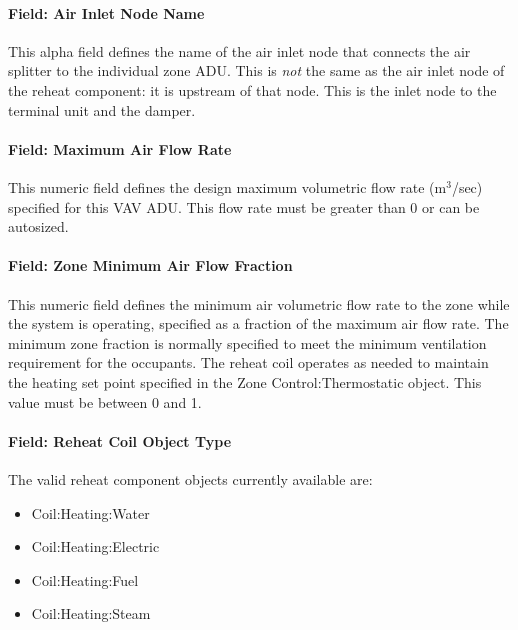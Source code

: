 \paragraph{Field: Air Inlet Node Name}\label{field-air-inlet-node-name-3}

This alpha field defines the name of the air inlet node that connects the air splitter to the individual zone ADU. This is \emph{not} the same as the air inlet node of the reheat component: it is upstream of that node. This is the inlet node to the terminal unit and the damper.

\paragraph{Field: Maximum Air Flow Rate}\label{field-maximum-air-flow-rate-3}

This numeric field defines the design maximum volumetric flow rate (m\(^{3}\)/sec) specified for this VAV ADU. This flow rate must be greater than 0 or can be autosized.

\paragraph{Field: Zone Minimum Air Flow Fraction}\label{field-zone-minimum-air-flow-fraction-1}

This numeric field defines the minimum air volumetric flow rate to the zone while the system is operating, specified as a fraction of the maximum air flow rate. The minimum zone fraction is normally specified to meet the minimum ventilation requirement for the occupants. The reheat coil operates as needed to maintain the heating set point specified in the Zone Control:Thermostatic object. This value must be between 0 and 1.

\paragraph{Field: Reheat Coil Object Type}\label{field-reheat-coil-object-type-2}

The valid reheat component objects currently available are:

\begin{itemize}
\item
  Coil:Heating:Water
\item
  Coil:Heating:Electric
\item
  Coil:Heating:Fuel
\item
  Coil:Heating:Steam
\end{itemize}

